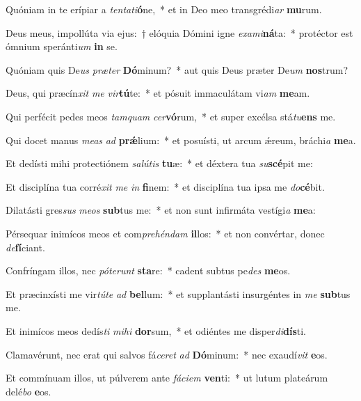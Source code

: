 \item Quóniam in te erípiar a \textit{ten}\textit{ta}\textit{ti}\textbf{ó}ne,~* et in Deo meo transgrédi\textit{ar} \textbf{mu}rum.
\item Deus meus, impollúta via ejus:~† elóquia Dómini igne \textit{ex}\textit{a}\textit{mi}\textbf{ná}ta:~* protéctor est ómnium speránti\textit{um} \textbf{in} se.
\item Quóniam quis De\textit{us} \textit{præ}\textit{ter} \textbf{Dó}minum?~* aut quis Deus præter De\textit{um} \textbf{nos}trum?
\item Deus, qui præcín\textit{xit} \textit{me} \textit{vir}\textbf{tú}te:~* et pósuit immaculátam vi\textit{am} \textbf{me}am.
\item Qui perfécit pedes meos \textit{tam}\textit{quam} \textit{cer}\textbf{vó}rum,~* et super excélsa stá\textit{tu}\textbf{ens} me.
\item Qui docet manus \textit{me}\textit{as} \textit{ad} \textbf{prǽ}lium:~* et posuísti, ut arcum ǽreum, bráchi\textit{a} \textbf{me}a.
\item Et dedísti mihi protectiónem \textit{sa}\textit{lú}\textit{tis} \textbf{tu}æ:~* et déxtera tua \textit{su}\textbf{scé}pit me:
\item Et disciplína tua corré\textit{xit} \textit{me} \textit{in} \textbf{fi}nem:~* et disciplína tua ipsa me \textit{do}\textbf{cé}bit.
\item Dilatásti gres\textit{sus} \textit{me}\textit{os} \textbf{sub}tus me:~* et non sunt infirmáta vestígi\textit{a} \textbf{me}a:
\item Pérsequar inimícos meos et com\textit{pre}\textit{hén}\textit{dam} \textbf{il}los:~* et non convértar, donec \textit{de}\textbf{fí}ciant.
\item Confríngam illos, nec \textit{pót}\textit{e}\textit{runt} \textbf{sta}re:~* cadent subtus pe\textit{des} \textbf{me}os.
\item Et præcinxísti me vir\textit{tú}\textit{te} \textit{ad} \textbf{bel}lum:~* et supplantásti insurgéntes in \textit{me} \textbf{sub}tus me.
\item Et inimícos meos dedís\textit{ti} \textit{mi}\textit{hi} \textbf{dor}sum,~* et odiéntes me disper\textit{di}\textbf{dís}ti.
\item Clamavérunt, nec erat qui salvos fá\textit{ce}\textit{ret} \textit{ad} \textbf{Dó}minum:~* nec exaudí\textit{vit} \textbf{e}os.
\item Et commínuam illos, ut púlverem ante \textit{fá}\textit{ci}\textit{em} \textbf{ven}ti:~* ut lutum plateárum delé\textit{bo} \textbf{e}os.
